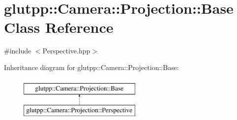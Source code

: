 \hypertarget{classglutpp_1_1Camera_1_1Projection_1_1Base}{\section{glutpp\-:\-:\-Camera\-:\-:\-Projection\-:\-:\-Base \-Class \-Reference}
\label{classglutpp_1_1Camera_1_1Projection_1_1Base}
}


 




{\ttfamily \#include $<$\-Perspective.\-hpp$>$}

\-Inheritance diagram for glutpp\-:\-:\-Camera\-:\-:\-Projection\-:\-:\-Base\-:\begin{figure}[H]
\begin{center}
\leavevmode
\includegraphics[height=2.000000cm]{classglutpp_1_1Camera_1_1Projection_1_1Base}
\end{center}
\end{figure}
